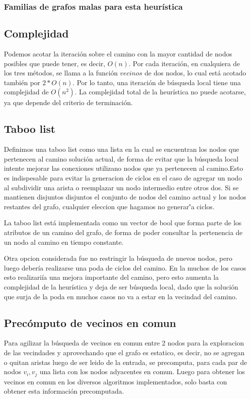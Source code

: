 \subsubsection{Familias de grafos malas para esta heur\'istica}

\subsection{Complejidad}

Podemos acotar la iteraci\'on sobre el camino con la mayor cantidad de nodos posibles que puede tener, es decir, $O(n)$. Por cada iteraci\'on, en cualquiera de los tres m\'etodos, se llama a la funci\'on $vecinos$ de dos nodos, lo cual est\'a acotado tambi\'en por $2*O(n)$. Por lo tanto, una iteraci\'on de b\'usqueda local tiene una complejidad de $O(n^2)$. La complejidad total de la heur\'istica no puede acotarse, ya que depende del criterio de terminaci\'on.

\subsection{Taboo list}
  Definimos una taboo list como una lista en la cual se encuentran los nodos que pertenecen al camino soluci\'on actual, de forma de evitar que la b\'usqueda local intente mejorar las conexiones utilizano nodos que ya pertenecen al camino.Esto es indispesable para evitar la generacion de ciclos en el caso de agregar un nodo al subdividir una arista o reemplazar un nodo
intermedio entre otros dos. Si se mantienen disjuntos disjuntos el conjunto de nodos del camino actual y los nodos restantes del grafo, cualquier eleccion que hagamos no generar\''a ciclos.


\vspace{2mm}

La taboo list est\'a implementada como un vector de bool que forma parte de los atributos de un camino del grafo, de forma de poder consultar la pertenencia de un nodo al camino en tiempo constante.

\vspace{2mm}

	Otra opcion considerada fue no restringir la b\'usqueda de nuevos nodos, pero luego deber\'ia realizarse una poda de ciclos del camino. En la muchos de los casos esto realizari\'ia una mejora importante del camino, pero esto aumenta la complejidad de la heur\'istica y deja de ser b\'usqueda local, dado que la soluci\'on que surja de la poda en muchos casos no va a estar en la vecindad del camino.
 
\subsection{Prec\'omputo de vecinos en comun}
Para agilizar la b\'usqueda de vecinos en comun entre 2 nodos para la exploracion de las vecindades y aprovechando que el grafo es estatico, es decir, no se agregan o quitan aristas luego de ser leido de la entrada, se precomputa, para cada par de nodos $v_i,v_j$ una lista con los nodos adyacentes en comun. Luego para obtener los vecinos en comun en los diversos algoritmos implementados, solo basta con obtener esta informaci\'on precomputada.